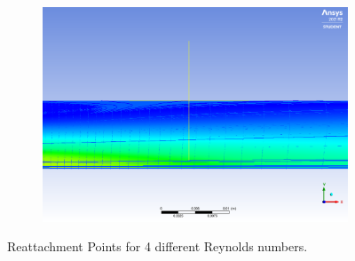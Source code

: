 \begin{figure}[H]
\begin{subfigure}{.75\textwidth}
  \subcaption{}
  \label{fig:reat_c}
\end{subfigure}
\hfill
\begin{subfigure}{.75\textwidth}
  \centering
  \includegraphics[width=.95\linewidth]{images/task1/150_attachement_0_0681.png}
  \subcaption{}
  \label{fig:reat_d}
\end{subfigure}
\caption{Reattachment Points for 4 different Reynolds numbers.}
\label{fig:reattach}
\end{figure}


